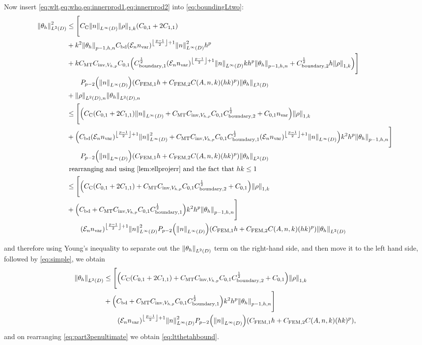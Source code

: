 Now insert \cref{eq:wlt,eq:who,eq:innerprod1,eq:innerprod2} into \cref{eq:boundingLtwo}:
\begin{align*}
\NLtD{\thetah}^2 &\leq \Bigg[\Cc\NLiD{n} \NW{\rho} \mleft(\Cfn{0,1} + 2\Cfn{1,1}\mright)\\
&+k^2\Nfn{p-1,h,n}{\thetah}  \Cfourteen \mleft(\En \nvar\mright)^{\floor{\frac{p-1}2}+1}\NLiD{n}^2 h^p \\
&+k\CMT \CinvVhp \Cfn{0,1} \mleft(\Cboundaryo^{\half} \mleft(\En\nvar\mright)^{\floor{\frac{p-1}2}+1}\NLiD{n} k h^{p} \Nfn{p-1,h,n}{\thetah} + \Cboundaryt^{\half} h \NW{\rho}\mright)\Bigg]\nonumber\\
&\quad\quad \Pfn{p-2}\mleft(\NLiD{n}\mright)\mleft(\CFEMotilde h + \CFEMttilde \CAnk (hk)^p\mright)\NLtD{\thetah}\\
&+\NLtDn{\rho}\NLtDn{\thetah}\nonumber\\
&\leq \Bigg[\mleft(\Cc\mleft(\Cfn{0,1} + 2\Cfn{1,1}\mright)\NLiD{n} + \CMT \CinvVhp \Cfn{0,1} \Cboundaryt^{\half} + \Cfn{0,1}\nvar  \mright)\NW{\rho} \\
&+\mleft(  \Cfourteen \mleft(\En \nvar\mright)^{\floor{\frac{p-1}2}+1}\NLiD{n}^2 + \CMT \CinvVhp \Cfn{0,1}\Cboundaryo^{\half} \mleft(\En\nvar\mright)^{\floor{\frac{p-1}2}+1}\NLiD{n}\mright)k^2h^p\Nfn{p-1,h,n}{\thetah}\Bigg]\nonumber\\
&\quad\quad \Pfn{p-2}\mleft(\NLiD{n}\mright)\mleft(\CFEMotilde h + \CFEMttilde \CAnk (hk)^p\mright)\NLtD{\thetah}\nonumber\\
&\text{ rearranging and using \cref{lem:ellprojerr} and the fact that $hk \leq 1$}\nonumber\\
&\leq \Bigg[\mleft(\Cc\mleft(\Cfn{0,1} + 2\Cfn{1,1}\mright) + \CMT \CinvVhp \Cfn{0,1} \Cboundaryt^{\half} + \Cfn{0,1}  \mright)\NW{\rho} \nonumber\\
&+\mleft(  \Cfourteen  + \CMT \CinvVhp \Cfn{0,1}\Cboundaryo^{\half} \mright)k^2h^p\Nfn{p-1,h,n}{\thetah}\Bigg]\nonumber\\
&\quad\quad \mleft(\En \nvar\mright)^{\floor{\frac{p-1}2}+1}\NLiD{n}^2\Pfn{p-2}\mleft(\NLiD{n}\mright)\mleft(\CFEMotilde h + \CFEMttilde \CAnk (hk)^p\mright)\NLtD{\thetah}\nonumber\\
\end{align*}


and therefore using Young's inequality to separate out the $\NLtD{\thetah}$ term on the right-hand side, and then move it to the left hand side, followed by \cref{eq:simple}, we obtain
\begin{align}
\NLtD{\thetah}&\leq \Bigg[\mleft(\Cc\mleft(\Cfn{0,1} + 2\Cfn{1,1}\mright) + \CMT \CinvVhp \Cfn{0,1} \Cboundaryt^{\half} + \Cfn{0,1}  \mright)\NW{\rho}\nonumber \\
&+\mleft(  \Cfourteen  + \CMT \CinvVhp \Cfn{0,1}\Cboundaryo^{\half} \mright)k^2h^p\Nfn{p-1,h,n}{\thetah}\Bigg]\nonumber\\
&\quad\quad \mleft(\En \nvar\mright)^{\floor{\frac{p-1}2}+1}\NLiD{n}^2\Pfn{p-2}\mleft(\NLiD{n}\mright)\mleft(\CFEMotilde h + \CFEMttilde \CAnk (hk)^p\mright)\label{eq:part3penultimate},
\end{align}
and on rearranging \cref{eq:part3penultimate} we obtain \cref{eq:ltthetahbound}.

